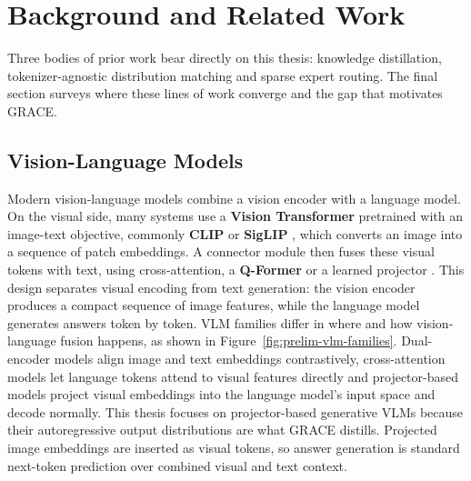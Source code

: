 \chapter{Background and Related Work}
\label{chap:preliminaries}

Three bodies of prior work bear directly on this thesis: knowledge distillation,
tokenizer-agnostic distribution matching and sparse expert routing. The final
section surveys where these lines of work converge and the gap that motivates GRACE.

\section{Vision-Language Models}

Modern vision-language models combine a vision encoder with a language model. On the visual side, many systems use a \textbf{Vision Transformer} pretrained
with an image-text objective, commonly \textbf{CLIP}
\cite{radford2021learningtransferablevisualmodels} or \textbf{SigLIP}
\cite{zhai2023sigmoidlosslanguageimage}, which converts an image into a
sequence of patch embeddings. A connector module then fuses these visual tokens with text, using
cross-attention, a \textbf{Q-Former} or a learned projector
\cite{alayrac2022flamingovisuallanguagemodel,li2023blip2bootstrappinglanguageimagepretraining,liu2023visualinstructiontuning}. This design separates visual encoding from text generation: the vision
encoder produces a compact sequence of image features, while the language model
generates answers token by token. VLM families differ
in where and how vision-language fusion happens, as shown
in Figure~\ref{fig:prelim-vlm-families}. Dual-encoder models align image and
text embeddings contrastively, cross-attention models let language tokens
attend to visual features directly and projector-based models project visual embeddings into the language model's
input space and decode normally. This thesis focuses on projector-based generative VLMs because their
autoregressive output distributions are what GRACE distills. Projected image
embeddings are inserted as visual tokens, so answer generation is standard
next-token prediction over combined visual and text context.


